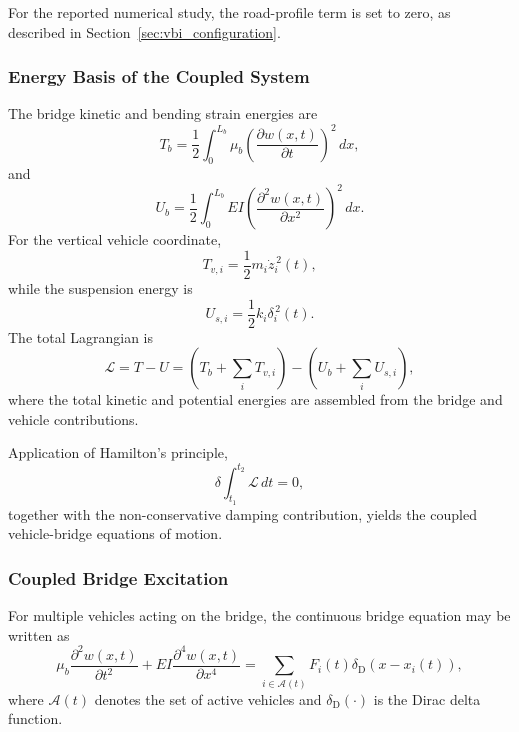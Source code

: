 \documentclass[journal]{IEEEtran}
\begin{document}
For the reported numerical study, the road-profile term is set to zero, as described in Section~\ref{sec:vbi_configuration}.


\subsubsection{Energy Basis of the Coupled System}

The bridge kinetic and bending strain energies are
\begin{equation}
T_b=\frac{1}{2}\int_{0}^{L_b}\mu_b\left(\frac{\partial w(x,t)}{\partial t}\right)^2\,dx,
\end{equation}
and
\begin{equation}
U_b=\frac{1}{2}\int_{0}^{L_b}EI\left(\frac{\partial^2 w(x,t)}{\partial x^2}\right)^2\,dx.
\end{equation}
For the vertical vehicle coordinate,
\begin{equation}
T_{v,i}=\frac{1}{2}m_i\dot{z}_i^{\,2}(t),
\end{equation}
while the suspension energy is
\begin{equation}
U_{s,i}=\frac{1}{2}k_i\delta_i^{\,2}(t).
\end{equation}
The total Lagrangian is
\begin{equation}
\mathcal{L}=T-U=\left(T_b+\sum_i T_{v,i}\right)-\left(U_b+\sum_i U_{s,i}\right),
\end{equation}
where the total kinetic and potential energies are assembled from the bridge and vehicle contributions.

Application of Hamilton's principle,
\begin{equation}
\delta\int_{t_1}^{t_2}\mathcal{L}\,dt=0,
\end{equation}
together with the non-conservative damping contribution, yields the coupled vehicle-bridge equations of motion.

\subsubsection{Coupled Bridge Excitation}

For multiple vehicles acting on the bridge, the continuous bridge equation may be written as
\begin{equation}
\mu_b\frac{\partial^2 w(x,t)}{\partial t^2}+EI\frac{\partial^4 w(x,t)}{\partial x^4}=\sum_{i\in\mathcal{A}(t)}F_i(t)\delta_{\mathrm{D}}\left(x-x_i(t)\right),
\end{equation}
where $\mathcal{A}(t)$ denotes the set of active vehicles and $\delta_{\mathrm{D}}(\cdot)$ is the Dirac delta function.
\end{document}
